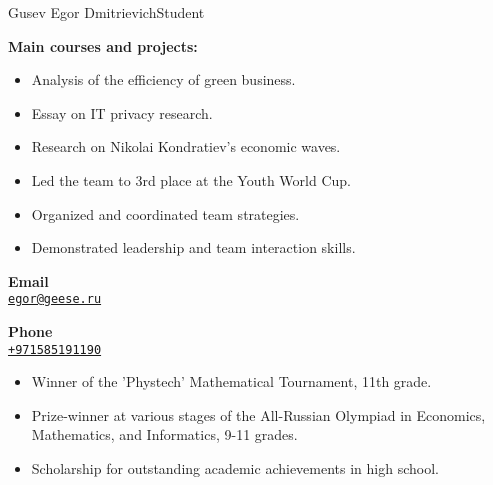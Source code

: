 \documentclass{article}
\begin{document}
\begin{cv}[avatar]{Gusev Egor Dmitrievich}{Student}
\begin{cvevent}[2022][2020]
	\textbf{Main courses and projects:}
	\begin{itemize}
		\item Analysis of the efficiency of green business.
		\item Essay on IT privacy research.
		\item Research on Nikolai Kondratiev's economic waves.
	\end{itemize}
\end{cvevent}

\begin{cvevent}[2021][2022]
	\begin{itemize}
		\item Led the team to 3rd place at the Youth World Cup.
		\item Organized and coordinated team strategies.
		\item Demonstrated leadership and team interaction skills.
	\end{itemize}
\end{cvevent}



\cvsidebar 


\begin{cvitem}[Envelope][0.6]
    \textbf{Email}\\
    \href{mailto:egor@geese.ru}{\texttt{egor@geese.ru}}
\end{cvitem}

\cvseparator[3]
\begin{cvitem}[Phone][0.6]
    \textbf{Phone}\\
    \href{tel:+971585191190}{\texttt{+971585191190}}
\end{cvitem}


\begin{cvitem}[leadership]{}
    \begin{itemize}
        \item Winner of the 'Phystech' Mathematical Tournament, 11th grade.
        \item Prize-winner at various stages of the All-Russian Olympiad in Economics, Mathematics, and Informatics, 9-11 grades.
        \item Scholarship for outstanding academic achievements in high school.
    \end{itemize}
\end{cvitem}


\end{cv}
\end{document}
